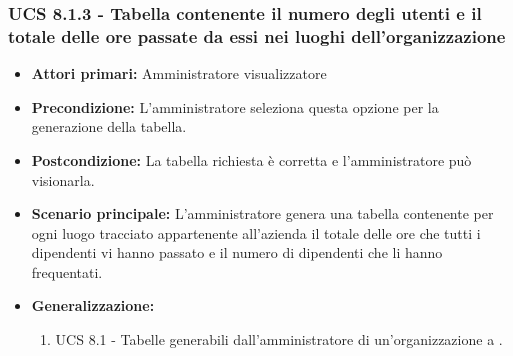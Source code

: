\subsubsection{UCS 8.1.3 - Tabella contenente il numero degli utenti e il totale delle ore passate da essi nei luoghi dell'organizzazione}%
\begin{itemize}
\item \textbf{Attori primari:} Amministratore visualizzatore
\item \textbf{Precondizione:} L'amministratore seleziona questa opzione per la generazione della tabella.
\item \textbf{Postcondizione:} La tabella richiesta è corretta e l'amministratore può visionarla.
\item \textbf{Scenario principale:} L'amministratore genera una tabella contenente per ogni luogo tracciato appartenente all'azienda il totale delle ore che tutti i dipendenti vi hanno passato e il numero di dipendenti che li hanno frequentati.
\item \textbf{Generalizzazione:}
	\begin{enumerate}
		\item UCS 8.1 - Tabelle generabili dall'amministratore di un'organizzazione a .
	\end{enumerate} 
\end{itemize}

